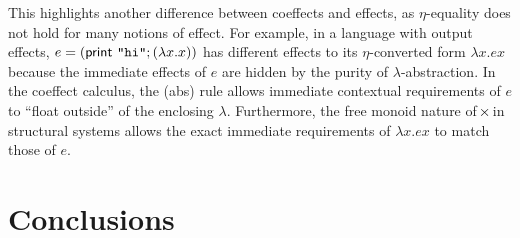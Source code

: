 This highlights another difference between coeffects and effects, as $\eta$-equality does
not hold for many notions of effect. For example, in a language with output
effects, $e = (\textsf{print \texttt{"hi"}}; (\lambda x . x))$ has different effects to 
its $\eta$-converted form $\lambda x . e x$ because the immediate effects of $e$ are
hidden by the purity of $\lambda$-abstraction. In the coeffect calculus, the (abs) rule
allows immediate contextual requirements of $e$ to ``float outside'' of the enclosing
$\lambda$. Furthermore, the free monoid nature of $\hspace{-0.15em}\times\hspace{-0.25em}$ in structural systems allows 
the exact immediate requirements of $\lambda x . e x$ to match those of $e$. 


\newpage

\section{Conclusions}

